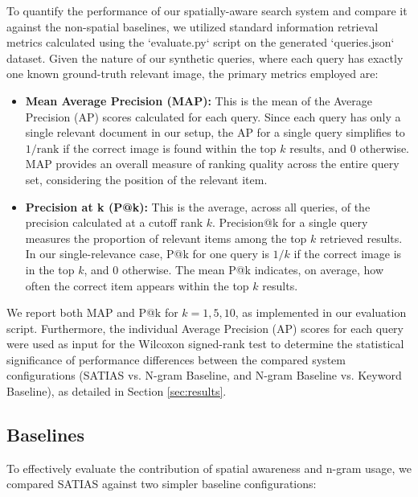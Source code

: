\documentclass[manuscript,screen]{acmart}
\begin{document}
To quantify the performance of our spatially-aware search system and compare it against the non-spatial baselines, we utilized standard information retrieval metrics calculated using the `evaluate.py` script on the generated `queries.json` dataset. Given the nature of our synthetic queries, where each query has exactly one known ground-truth relevant image, the primary metrics employed are:

\begin{itemize}
    \item \textbf{Mean Average Precision (MAP):} This is the mean of the Average Precision (AP) scores calculated for each query. Since each query has only a single relevant document in our setup, the AP for a single query simplifies to $1/\text{rank}$ if the correct image is found within the top $k$ results, and 0 otherwise. MAP provides an overall measure of ranking quality across the entire query set, considering the position of the relevant item.
    \item \textbf{Precision at k (P@k):} This is the average, across all queries, of the precision calculated at a cutoff rank $k$. Precision@k for a single query measures the proportion of relevant items among the top $k$ retrieved results. In our single-relevance case, P@k for one query is $1/k$ if the correct image is in the top $k$, and 0 otherwise. The mean P@k indicates, on average, how often the correct item appears within the top $k$ results.
\end{itemize}

We report both MAP and P@k for $k=1, 5, 10$, as implemented in our evaluation script. Furthermore, the individual Average Precision (AP) scores for each query were used as input for the Wilcoxon signed-rank test to determine the statistical significance of performance differences between the compared system configurations (SATIAS vs. N-gram Baseline, and N-gram Baseline vs. Keyword Baseline), as detailed in Section \ref{sec:results}.

\subsection{Baselines}
\label{sec:baselines}

To effectively evaluate the contribution of spatial awareness and n-gram usage, we compared SATIAS against two simpler baseline configurations:
\end{document}
